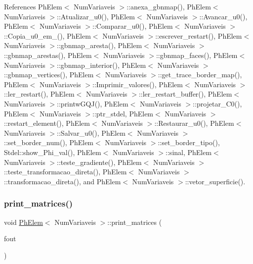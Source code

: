 References Ph\+Elem$<$ Num\+Variaveis $>$\+::anexa\+\_\+gbnmap(), Ph\+Elem$<$ Num\+Variaveis $>$\+::\+Atualizar\+\_\+u0(), Ph\+Elem$<$ Num\+Variaveis $>$\+::\+Avancar\+\_\+u0(), Ph\+Elem$<$ Num\+Variaveis $>$\+::\+Comparar\+\_\+u0(), Ph\+Elem$<$ Num\+Variaveis $>$\+::\+Copia\+\_\+u0\+\_\+em\+\_\+(), Ph\+Elem$<$ Num\+Variaveis $>$\+::escrever\+\_\+restart(), Ph\+Elem$<$ Num\+Variaveis $>$\+::gbnmap\+\_\+aresta(), Ph\+Elem$<$ Num\+Variaveis $>$\+::gbnmap\+\_\+arestas(), Ph\+Elem$<$ Num\+Variaveis $>$\+::gbnmap\+\_\+faces(), Ph\+Elem$<$ Num\+Variaveis $>$\+::gbnmap\+\_\+interior(), Ph\+Elem$<$ Num\+Variaveis $>$\+::gbnmap\+\_\+vertices(), Ph\+Elem$<$ Num\+Variaveis $>$\+::get\+\_\+trace\+\_\+border\+\_\+map(), Ph\+Elem$<$ Num\+Variaveis $>$\+::\+Imprimir\+\_\+valores(), Ph\+Elem$<$ Num\+Variaveis $>$\+::ler\+\_\+restart(), Ph\+Elem$<$ Num\+Variaveis $>$\+::ler\+\_\+restart\+\_\+buffer(), Ph\+Elem$<$ Num\+Variaveis $>$\+::printw\+G\+Q\+J(), Ph\+Elem$<$ Num\+Variaveis $>$\+::projetar\+\_\+\+C0(), Ph\+Elem$<$ Num\+Variaveis $>$\+::ptr\+\_\+stdel, Ph\+Elem$<$ Num\+Variaveis $>$\+::restart\+\_\+element(), Ph\+Elem$<$ Num\+Variaveis $>$\+::\+Restaurar\+\_\+u0(), Ph\+Elem$<$ Num\+Variaveis $>$\+::\+Salvar\+\_\+u0(), Ph\+Elem$<$ Num\+Variaveis $>$\+::set\+\_\+border\+\_\+num(), Ph\+Elem$<$ Num\+Variaveis $>$\+::set\+\_\+border\+\_\+tipo(), Stdel\+::show\+\_\+\+Phi\+\_\+val(), Ph\+Elem$<$ Num\+Variaveis $>$\+::sinal, Ph\+Elem$<$ Num\+Variaveis $>$\+::teste\+\_\+gradiente(), Ph\+Elem$<$ Num\+Variaveis $>$\+::teste\+\_\+transformacao\+\_\+direta(), Ph\+Elem$<$ Num\+Variaveis $>$\+::transformacao\+\_\+direta(), and Ph\+Elem$<$ Num\+Variaveis $>$\+::vetor\+\_\+superficie().

\mbox{\label{classPhElem_a233fb1bc0c15cae815fef5d1dc8d9265}} 
\subsubsection{\texorpdfstring{print\+\_\+matrices()}{print\_matrices()}}
{\footnotesize\ttfamily void \hyperlink{classPhElem}{Ph\+Elem}$<$ Num\+Variaveis $>$\+::print\+\_\+matrices (\begin{DoxyParamCaption}\item[{F\+I\+LE $\ast$}]{fout }\end{DoxyParamCaption})\hspace{0.3cm}{\ttfamily [inherited]}}

